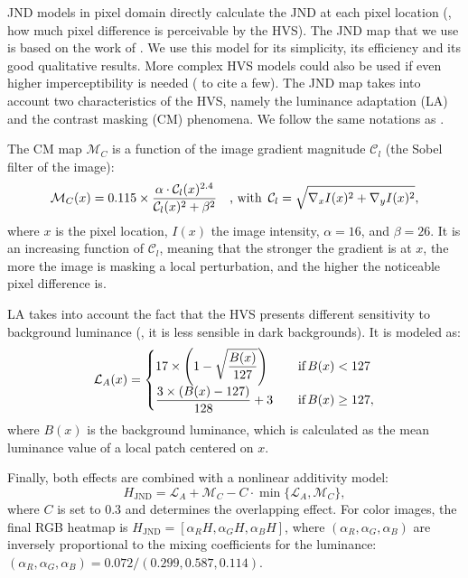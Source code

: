 JND models in pixel domain directly calculate the JND at each pixel location (\ie, how much pixel difference is perceivable by the HVS). The JND map that we use is based on the work of \citep{chou1995perceptually}.
We use this model for its simplicity, its efficiency and its good qualitative results.
More complex HVS models could also be used if even higher imperceptibility is needed (\citep{watson1993dct, yang2005just, zhang2008just, jiang2022jnd} to cite a few).
The JND map takes into account two characteristics of the HVS, namely the luminance adaptation (LA) and the contrast masking (CM) phenomena. We follow the same notations as \citep{wu2017enhanced}.

The CM map $\mathcal{M}_C$ is a function of the image gradient magnitude $\mathcal{C}_l$ (the Sobel filter of the image):
\begin{equation}
    \mathcal{M}_C(x) = 0.115 \times 
    \frac{\alpha \cdot \mathcal{C}_l(x)^{2.4}}
    { \mathcal{C}_l(x)^{2} + \beta^2}
    \textrm{\quad , with \,}
    \mathcal{C}_l = \sqrt{ \nabla_x I(x)^2 + \nabla_y I(x)^2},
\end{equation}
where $x$ is the pixel location, $I(x)$ the image intensity, $\alpha = 16$, and $\beta = 26$. 
It is an increasing function of $\mathcal{C}_l$, meaning that the stronger the gradient is at $x$, the more the image is masking a local perturbation, and the higher the noticeable pixel difference is.

LA takes into account the fact that the HVS presents different sensitivity to background luminance (\eg, it is less sensible in dark backgrounds).
It is modeled as:
\begin{align}
    \mathcal{L}_A (x) =
    \begin{cases}
        \displaystyle 17 \times \left( 1-\sqrt{\frac{B(x)}{127}} \right) & \textrm{\quad if\,} B(x)<127 \\
        \displaystyle \frac{3 \times \left( B(x) - 127 \right)}{128} +3 & \textrm{\quad if\,}B(x)\geq 127, 
    \end{cases}
\end{align}
where $B(x)$ is the background luminance, which is calculated as the mean luminance value of a local patch centered on $x$.

Finally, both effects are combined with a nonlinear additivity model:
\begin{equation}
    H_{\mathrm{JND}} = \mathcal{L}_A + \mathcal{M}_C - C \cdot \min \{ \mathcal{L}_A, \mathcal{M}_C \},
\end{equation}
where $C$ is set to $0.3$ and determines the overlapping effect. 
For color images, the final RGB heatmap is $H_{\mathrm{JND}} = [\alpha_R H, \alpha_G H, \alpha_B H]$, where $(\alpha_{R}, \alpha_{G}, \alpha_{B})$ are inversely proportional to the mixing coefficients for the luminance: $(\alpha_{R}, \alpha_{G}, \alpha_{B}) = 0.072 / (0.299, 0.587, 0.114)$.




